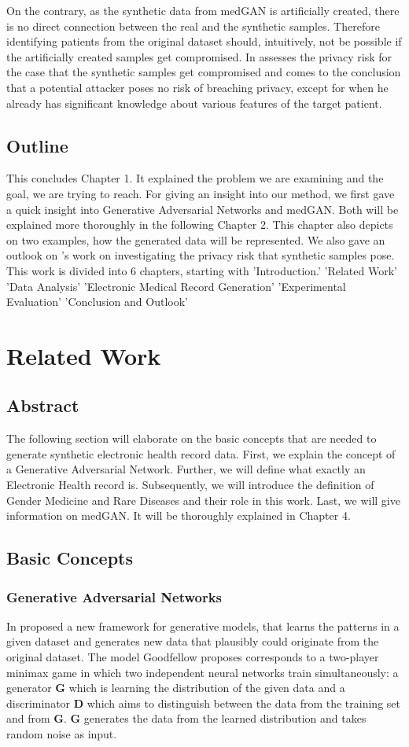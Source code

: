 \documentclass[11pt, a4paper]{book}
\begin{document}
On the contrary, as the synthetic data from medGAN is artificially created, there is no direct connection between the real and the synthetic samples. Therefore identifying patients from the original dataset should, intuitively, not be possible if the artificially created samples get compromised. In \cite{Choi2017} assesses the privacy risk for the case that the synthetic samples get compromised and comes to the conclusion that a potential attacker poses no risk of breaching privacy, except for when he already has significant knowledge about various features of the target patient.
\section{Outline}
This concludes Chapter 1. It explained the problem we are examining and the goal, we are trying to reach.
For giving an insight into our method, we first gave a quick insight into Generative Adversarial Networks and medGAN. Both will be explained more thoroughly in the following Chapter 2. This chapter also depicts on two examples, how the generated data will be represented. We also gave an outlook on \cite{Choi2017}'s work on investigating the privacy risk that synthetic samples pose.
This work is divided into 6 chapters, starting with 'Introduction.'
'Related Work'
'Data Analysis'
'Electronic Medical Record Generation'
'Experimental Evaluation'
'Conclusion and Outlook'
\chapter{Related Work}
\section{Abstract}
The following section will elaborate on the basic concepts that are needed to  generate synthetic electronic health record data.
First, we explain the concept of a Generative Adversarial Network. Further, we will define what exactly an Electronic Health record is. Subsequently, we will introduce the definition of Gender Medicine and Rare Diseases and their role in this work. Last, we will give information on medGAN. It will be thoroughly explained in Chapter 4.

\section{Basic Concepts}
\subsection{Generative Adversarial Networks}
In \cite{goodfellow2014generative} proposed a new framework for generative models, that learns the patterns in a given dataset and generates new data that plausibly could originate from the original dataset.
 The model Goodfellow proposes corresponds to a two-player minimax game in which two independent neural networks train simultaneously: a generator \textbf{G} which is learning the distribution of the given data and a discriminator \textbf{D} which aims to distinguish between the data from the training set and from \textbf{G}. \textbf{G} generates the data from the learned distribution and takes random noise as input.
\end{document}
